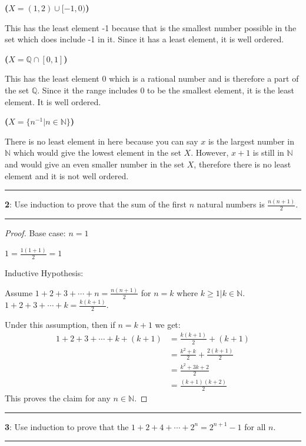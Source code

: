 \documentclass[11pt]{article}
\newcommand\question[2]{\vspace{.25in}\hrule\textbf{#1}: #2\vspace{.5em}\hrule\vspace{.10in}}
\renewcommand\part[1]{\vspace{.10in}\textbf{(#1)}\par}
\newcommand{\N}{\mathbb{N}}
\newcommand{\Q}{\mathbb{Q}}
\begin{document}
\part{$X = (1, 2) \cup [-1, 0)$}
	This has the least element -1 because that is the smallest number possible in the set which does include -1 in it. Since it has a least element, it is well ordered.

\part{$X = \Q \cap [0, 1]$}
	This has the least element 0 which is a rational number and is therefore a part of the set $\Q$. Since it the range includes 0 to be the smallest element, it is the least element. It is well ordered.

\part{$X = \{n^{-1} | n \in \N\}$}
	There is no least element in here because you can say $x$ is the largest number in $\N$ which would give the lowest element in the set $X$. However, $x+1$ is still in $\N$ and would give an even smaller number in the set $X$, therefore there is no least element and it is not well ordered.

\question{2}{Use induction to prove that the sum of the first $n$ natural numbers is $\frac{n(n+1)}{2}$.}

\begin{proof}
	Base case: $n=1$

	$1 = \frac{1(1+1)}{2} = 1$

	Inductive Hypothesis:

	Assume $1+2+3+\cdots+n = \frac{n(n+1)}{2}$ for $n=k$ where $k \ge 1 | k \in \N$. $1+2+3+\cdots+k = \frac{k(k+1)}{2}$.

	Under this assumption, then if $n=k+1$ we get:
	\begin{align*}
		1+2+3+\cdots+k+(k+1) &= \frac{k(k+1)}{2} + (k+1)\\
		&= \frac{k^2+k}{2} + \frac{2(k+1)}{2}\\
		&= \frac{k^2 + 3k + 2}{2}\\
		&= \frac{(k+1)(k+2)}{2}
	\end{align*}
	This proves the claim for any $n \in \N$.
\end{proof}

\question{3}{Use induction to prove that the $1+2+4 + \cdots + 2^n = 2^{n+1}-1$ for all $n$.}
\end{document}
